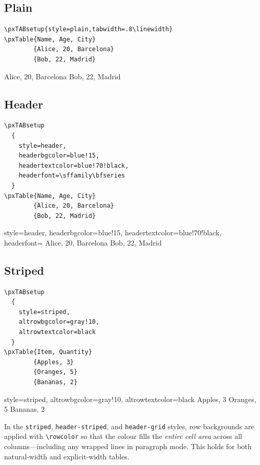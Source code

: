 \documentclass[11pt,a4paper]{article}
\begin{document}
\subsection{Plain}

\begin{verbatim}
\pxTABsetup{style=plain,tabwidth=.8\linewidth}
\pxTable{Name, Age, City}
        {Alice, 20, Barcelona}
        {Bob, 22, Madrid}
\end{verbatim}

        {Alice, 20, Barcelona}
        {Bob, 22, Madrid}

\subsection{Header}

\begin{verbatim}
\pxTABsetup
  {
    style=header,
    headerbgcolor=blue!15,
    headertextcolor=blue!70!black,
    headerfont=\sffamily\bfseries
  }
\pxTable{Name, Age, City}
        {Alice, 20, Barcelona}
        {Bob, 22, Madrid}
\end{verbatim}

\pxTABsetup
  {
    style=header,
    headerbgcolor=blue!15,
    headertextcolor=blue!70!black,
    headerfont=\sffamily\bfseries
  }
        {Alice, 20, Barcelona}
        {Bob, 22, Madrid}

\subsection{Striped}

\begin{verbatim}
\pxTABsetup
  {
    style=striped,
    altrowbgcolor=gray!10,
    altrowtextcolor=black
  }
\pxTable{Item, Quantity}
        {Apples, 3}
        {Oranges, 5}
        {Bananas, 2}

\end{verbatim}

\pxTABsetup
  {
    style=striped,
    altrowbgcolor=gray!10,
    altrowtextcolor=black
  }
        {Apples, 3}
        {Oranges, 5}
        {Bananas, 2}

\noindent
In the \texttt{striped}, \texttt{header-striped}, and
\texttt{header-grid} styles, row backgrounds are applied with
\verb|\rowcolor| so that the colour fills the \emph{entire cell area}
across all columns---including any wrapped lines in paragraph mode.
This holds for both natural-width and explicit-width tables.
\end{document}
